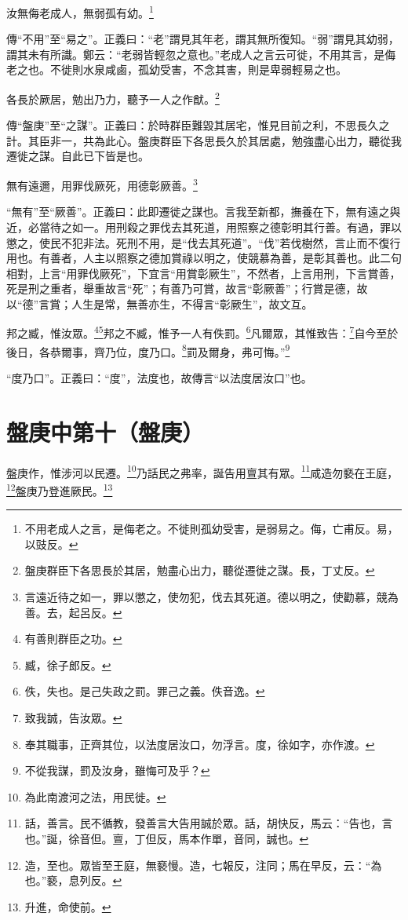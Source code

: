 汝無侮老成人，無弱孤有幼。\footnote{不用老成人之言，是侮老之。不徙則孤幼受害，是弱易之。侮，亡甫反。易，以豉反。}

{\noindent\zhuan{}\fzbyks 傳“不用”至“易之”。正義曰：“老”謂見其年老，謂其無所復知。“弱”謂見其幼弱，謂其未有所識。鄭云：“老弱皆輕忽之意也。”老成人之言云可徙，不用其言，是侮老之也。不徙則水泉咸鹵，孤幼受害，不念其害，則是卑弱輕易之也。 \par}

各長於厥居，勉出乃力，聽予一人之作猷。\footnote{盤庚群臣下各思長於其居，勉盡心出力，聽從遷徙之謀。長，丁丈反。}

{\noindent\zhuan{}\fzbyks 傳“盤庚”至“之謀”。正義曰：於時群臣難毀其居宅，惟見目前之利，不思長久之計。其臣非一，共為此心。盤庚群臣下各思長久於其居處，勉強盡心出力，聽從我遷徙之謀。自此已下皆是也。 \par}

無有遠邇，用罪伐厥死，用德彰厥善。\footnote{言遠近待之如一，罪以懲之，使勿犯，伐去其死道。德以明之，使勸慕，競為善。去，起呂反。}

{\noindent\shu{}\fzkt “無有”至“厥善”。正義曰：此即遷徙之謀也。言我至新都，撫養在下，無有遠之與近，必當待之如一。用刑殺之罪伐去其死道，用照察之德彰明其行善。有過，罪以懲之，使民不犯非法。死刑不用，是“伐去其死道”。“伐”若伐樹然，言止而不復行用也。有善者，人主以照察之德加賞祿以明之，使競慕為善，是彰其善也。此二句相對，上言“用罪伐厥死”，下宜言“用賞彰厥生”，不然者，上言用刑，下言賞善，死是刑之重者，舉重故言“死”；有善乃可賞，故言“彰厥善”；行賞是德，故以“德”言賞；人生是常，無善亦生，不得言“彰厥生”，故文互。 \par}

邦之臧，惟汝眾。\footnote{有善則群臣之功。}\footnote{臧，徐子郎反。}邦之不臧，惟予一人有佚罰。\footnote{佚，失也。是己失政之罰。罪己之義。佚音逸。}凡爾眾，其惟致告：\footnote{致我誠，告汝眾。}自今至於後日，各恭爾事，齊乃位，度乃口。\footnote{奉其職事，正齊其位，以法度居汝口，勿浮言。度，徐如字，亦作渡。}罰及爾身，弗可悔。”\footnote{不從我謀，罰及汝身，雖悔可及乎？}

{\noindent\shu{}\fzkt “度乃口”。正義曰：“度”，法度也，故傳言“以法度居汝口”也。 \par}

\section{盤庚中第十（盤庚）}

盤庚作，惟涉河以民遷。\footnote{為此南渡河之法，用民徙。}乃話民之弗率，誕告用亶其有眾。\footnote{話，善言。民不循教，發善言大告用誠於眾。話，胡快反，馬云：“告也，言也。”誕，徐音但。亶，丁但反，馬本作單，音同，誠也。}咸造勿褻在王庭，\footnote{造，至也。眾皆至王庭，無褻慢。造，七報反，注同；馬在早反，云：“為也。”褻，息列反。}盤庚乃登進厥民。\footnote{升進，命使前。}

